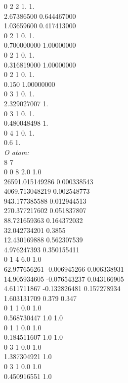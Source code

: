 \documentclass[11pt,DIV=13,BCOR=5mm,a4paper,headinclude]{scrbook}
\begin{document}
\begin{spacing}{0.5}
{0 2 2 1. 1.\\
       2.67386500         0.644467000\\
       1.03659600         0.417413000\\
0 2 1 0. 1.\\
      0.700000000          1.00000000\\
0 2 1 0. 1.\\
      0.316819000          1.00000000\\
0 2 1 0. 1.\\
      0.150          1.00000000\\
0  3  1  0.  1.\\
       2.329027007      1.\\
0  3  1  0.  1.\\
       0.480048498      1.\\
0  4  1  0.  1.\\
       0.6      1.\\
\textit{O atom:}\\
8 7\\
0 0 8 2.0 1.0\\
 26591.015149286   0.000338543\\
 4069.713048219    0.002548773\\
 943.177385588     0.012944513\\
 270.377217602     0.051837807\\
 88.721659363      0.164372032\\
 32.042734201      0.3855\\
 12.430169888      0.562307539\\
 4.976247393       0.350155411\\
0 1 4 6.0 1.0\\
 62.977656261     -0.006945266     0.006338931\\
 14.905934605     -0.076543237     0.043166905\\
 4.611711867      -0.132826481     0.157278934\\
 1.603131709       0.379           0.347\\
0 1 1 0.0 1.0\\
 0.568730447       1.0             1.0\\
0 1 1 0.0 1.0\\
 0.184511607       1.0             1.0\\
0 3 1 0.0 1.0\\
 1.387304921       1.0\\
0 3 1 0.0 1.0\\
 0.450916551       1.0\\
}
\end{spacing}
\end{document}
